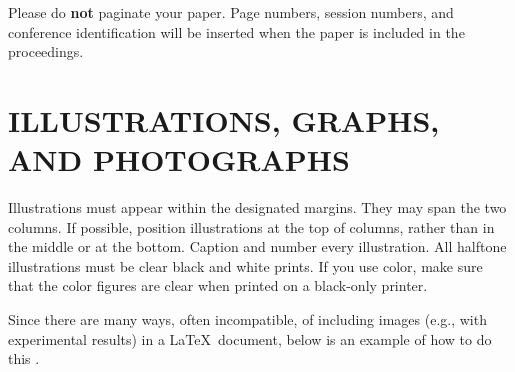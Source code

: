 \documentclass{article}
\begin{document}
Please do {\bf not} paginate your paper.  Page numbers, session numbers, and
conference identification will be inserted when the paper is included in the
proceedings.

\section{ILLUSTRATIONS, GRAPHS, AND PHOTOGRAPHS}
\label{sec:illust}

Illustrations must appear within the designated margins.  They may span the two
columns.  If possible, position illustrations at the top of columns, rather
than in the middle or at the bottom.  Caption and number every illustration.
All halftone illustrations must be clear black and white prints.  If you use
color, make sure that the color figures are clear when printed on a black-only
printer.

Since there are many ways, often incompatible, of including images (e.g., with
experimental results) in a \LaTeX\ document, below is an example of how to do
this \cite{Lamp86}.

%



\vfill
\pagebreak
\end{document}
